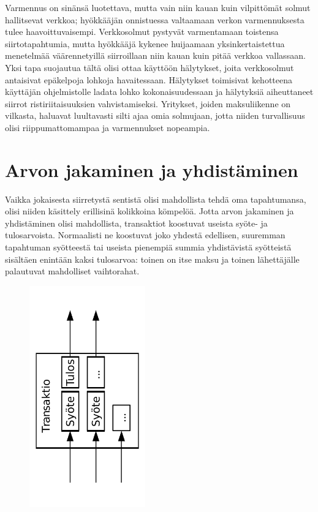 \documentclass{article}
\begin{document}
Varmennus on sinänsä luotettava, mutta vain niin kauan kuin vil\-pit\-tö\-mät solmut hallitsevat verkkoa; hyökkääjän onnistuessa valtaamaan verkon varmennuksesta tulee haavoittuvaisempi. Verkkosolmut pystyvät varmentamaan toistensa siirtotapahtumia, mutta hyökkääjä kykenee huijaamaan yksinkertaistettua menetelmää väärennetyillä siirroillaan niin kauan kuin pitää verkkoa vallassaan. Yksi tapa suojautua tältä olisi ottaa käyttöön hälytykset, joita verkkosolmut antaisivat epäkelpoja lohkoja havaitessaan. Hälytykset toimisivat kehotteena käyttäjän ohjelmistolle ladata lohko kokonaisuudessaan ja hälytyksiä aiheuttaneet siirrot ristiriitaisuuksien vahvistamiseksi. Yritykset, joiden maksuliikenne on vilkasta, haluavat luultavasti silti ajaa omia solmujaan, jotta niiden turvallisuus olisi riippumattomampaa ja varmennukset nopeampia.
\newpage
\section{Arvon jakaminen ja yhdistäminen}

Vaikka jokaisesta siirretystä sentistä olisi mahdollista tehdä oma tapahtumansa, olisi niiden käsittely erillisinä kolikkoina kömpelöä. Jotta arvon jakaminen ja yhdistäminen olisi mahdollista, transaktiot koostuvat useista syöte- ja tulosarvoista. Normaalisti ne koostuvat joko yhdestä edellisen, suuremman tapahtuman syötteestä tai useista pienempiä summia yhdistävistä syötteistä sisältäen enintään kaksi tulosarvoa: toinen on itse maksu ja toinen lähettäjälle palautuvat mahdolliset vaihtorahat.

\begin{figure}[H]
    \centering
    \includegraphics[angle=270,width=5cm]{figures/fig6.pdf}
\end{figure}
\end{document}
